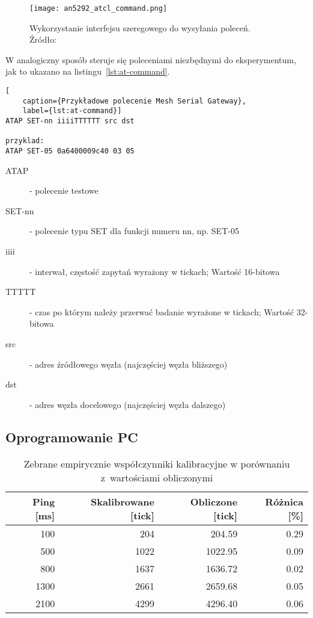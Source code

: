 \begin{figure}[!htb]
	\centering \texttt{[image: an5292\_atcl\_command.png]}
	\caption{Wykorzystanie interfejsu szeregowego do wysyłania poleceń. Źródło:~\cite{st_an5292_2021}}
	\label{an5292_atcl_command}
\end{figure}

W analogiczny sposób steruje się poleceniami niezbędnymi do eksperymentum, jak to ukazano na listingu~\ref{lst:at-command}.
\begin{lstlisting}[
    caption={Przykładowe polecenie Mesh Serial Gateway},
    label={lst:at-command}]
ATAP SET-nn iiiiTTTTTT src dst

przyklad:
ATAP SET-05 0a6400009c40 03 05
\end{lstlisting}

\begin{description}
\item [ATAP] - polecenie testowe
\item [SET-nn] - polecenie typu SET dla funkcji numeru nn, np. SET-05
\item [iiii] - interwał, częstość zapytań wyrażony w tickach; Wartość 16-bitowa
\item [TTTTT] - czas po którym należy przerwać badanie wyrażone w tickach; Wartość 32-bitowa
\item [src] - adres źródłowego węzła (najczęściej węzła bliższego)
\item [dst] - adres węzła docelowego (najczęściej węzła dalszego)
\end{description}


\subsection{Oprogramowanie PC} \label{prep:pc-software}

\begin{table}[!ht]
\centering
	\begin{tabular}{r|r|r|r}
	Ping [ms]         & Skalibrowane [tick] & Obliczone [tick]  & Różnica [\%] \\\hline
	100               & 204                 & 204.59            & 0.29         \\\hline
	500               & 1022                & 1022.95           & 0.09         \\\hline
	800               & 1637                & 1636.72           & 0.02         \\\hline
	1300              & 2661                & 2659.68           & 0.05         \\\hline
	2100              & 4299                & 4296.40           & 0.06         \\\hline
	\end{tabular}
\caption{\label{tab:calibration_vs_computation}Zebrane empirycznie współczynniki kalibracyjne w porównaniu z~wartościami obliczonymi}
\end{table}

